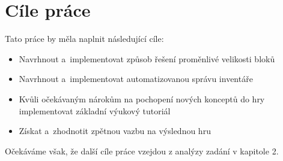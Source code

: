 \section{Cíle práce}
Tato práce by měla naplnit následující cíle:
\begin{itemize}
	\item Navrhnout a~implementovat způsob řešení proměnlivé velikosti bloků
	\item Navrhnout a~implementovat automatizovanou správu inventáře
	\item Kvůli očekávaným nárokům na pochopení nových konceptů do hry implementovat základní výukový tutoriál
	\item Získat a~zhodnotit zpětnou vazbu na výslednou hru
\end{itemize}
Očekáváme však, že další cíle práce vzejdou z analýzy zadání v kapitole 2.

